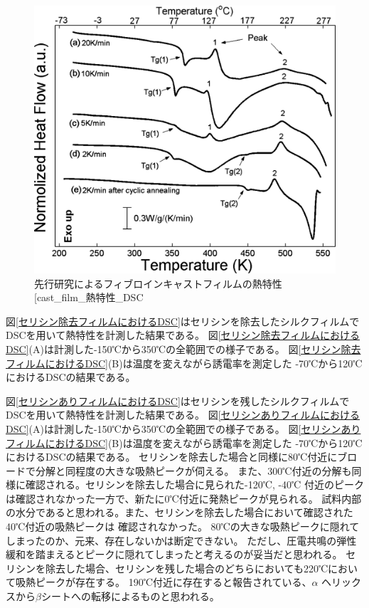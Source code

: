 \documentclass[dvipdfmx,12pt,a4paper]{jreport}
\makeatletter
\DeclareRobustCommand\cite{\unskip
    	\@ifnextchar[{\@tempswatrue\@citex}{\@tempswafalse\@citex[]}}
\makeatother
\begin{document}
		\begin{figure}[H]
			\centering
			\includegraphics[scale=1]{DSC_cast_film_report.jpeg}
			\caption{先行研究によるフィブロインキャストフィルムの熱特性\cite{cast_film_熱特性_DSC}}
			\label{cast_film_熱特性_DSC}
		\end{figure}
		\newpage
		図\ref{セリシン除去フィルムにおけるDSC}はセリシンを除去したシルクフィルムでDSCを用いて熱特性を計測した結果である。
		図\ref{セリシン除去フィルムにおけるDSC}(A)は計測した-150℃から350℃の全範囲での様子である。
		図\ref{セリシン除去フィルムにおけるDSC}(B)は温度を変えながら誘電率を測定した
		-70℃から120℃におけるDSCの結果である。
	
		図\ref{セリシンありフィルムにおけるDSC}はセリシンを残したシルクフィルムでDSCを用いて熱特性を計測した結果である。
		図\ref{セリシンありフィルムにおけるDSC}(A)は計測した-150℃から350℃の全範囲での様子である。
		図\ref{セリシンありフィルムにおけるDSC}(B)は温度を変えながら誘電率を測定した
		-70℃から120℃におけるDSCの結果である。
		セリシンを除去した場合と同様に80℃付近にブロードで分解と同程度の大きな吸熱ピークが伺える。
		また、300℃付近の分解も同様に確認される。セリシンを除去した場合に見られた-120℃, -40℃
		付近のピークは確認されなかった一方で、新たに0℃付近に発熱ピークが見られる。
		試料内部の水分であると思われる。また、セリシンを除去した場合において確認された40℃付近の吸熱ピークは
		確認されなかった。
		80℃の大きな吸熱ピークに隠れてしまったのか、元来、存在しないかは断定できない。
		ただし、圧電共鳴の弾性緩和を踏まえるとピークに隠れてしまったと考えるのが妥当だと思われる。
		セリシンを除去した場合、セリシンを残した場合のどちらにおいても220℃において吸熱ピークが存在する。
		190℃付近に存在すると報告されている、$\alpha$ ヘリックスから$\beta$シートへの転移によるものと思われる。
		\\
		\\
		\\
		\\
	
\end{document}
